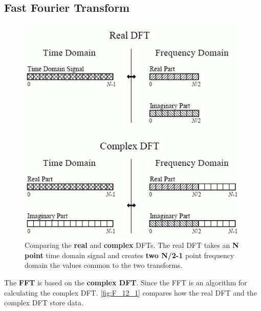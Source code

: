 \documentclass[a4paper,12pt]{article}
\begin{document}
\subsection{Fast Fourier Transform}

\begin{figure}
  \label{fig:F_12_1}
  \centering
	\includegraphics[width=\textwidth, keepaspectratio=true]{F_12_1}
\caption{Comparing the \textbf{real} and \textbf{complex} DFTs.
The real DFT takes an \textbf{N point} time domain signal and creates \textbf{two N/2-1} point frequency domain %
the values common to the two transforms.}
\end{figure}


The \textbf{FFT} is based on the \textbf{complex DFT}.
Since the FFT is an algorithm for calculating the complex DFT. \autoref{fig:F_12_1} compares how the real DFT and the complex DFT store data.\\
\end{document}
